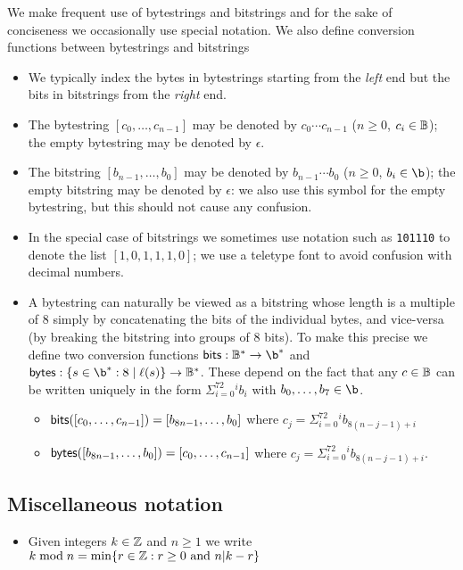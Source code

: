 We make frequent use of bytestrings and bitstrings and for the sake of
conciseness we occasionally use special notation.  We also define conversion
functions between bytestrings and bitstrings

\begin{itemize}
\item We typically index the bytes in bytestrings starting from the
  \textit{left} end but the bits in bitstrings from the \textit{right} end.

\item The bytestring $[c_0, \ldots, c_{n-1}]$ may be denoted by
  $c_0{\cdots}c_{n-1}$ ($n \geq 0$, $c_i \in \mathbb{B}$); the empty bytestring may be
  denoted by $\epsilon$.

\item The  bitstring $[b_{n-1}, \ldots, b_0]$ may be denoted by
  $b_{n-1}{\cdots}b_0$ ($n \geq 0$, $b_i \in \b$); the empty bitstring may be
  denoted by $\epsilon$: we also use this symbol for the empty bytestring, but
  this should not cause any confusion.

\item In the special case of bitstrings we sometimes use notation such as
  \texttt{101110} to denote the list $[1,0,1,1,1,0]$; we use a teletype font to
  avoid confusion with decimal numbers.

\item A bytestring can naturally be viewed as a bitstring whose length is a
  multiple of 8 simply by concatenating the bits of the individual bytes, and
  vice-versa (by breaking the bitstring into groups of 8 bits).  To make this
  precise we define two conversion functions $\bitsof: \B^* \rightarrow \b^*$
  and $\bytesof: \{s \in \b^* : 8 \mid \length(s)\} \rightarrow \B^*$.  These
  depend on the fact that any $c \in \mathbb{B}$ can be written uniquely in the form
  $\Sigma_{i=0}^72^ib_i$ with $b_0, \ldots, b_7 \in \b$.
  \begin{itemize}
    \item $\mathsf{bits}([c_0, \ldots, c_{n-1}]) = [b_{8n-1}, \ldots, b_0]$ where $c_j=\Sigma_{i=0}^72^ib_{8(n-j-1)+i}$
    \item $\mathsf{bytes}([b_{8n-1}, \ldots, b_0]) = [c_0, \ldots, c_{n-1}]$ where $c_j=\Sigma_{i=0}^72^ib_{8(n-j-1)+i}$.
  \end{itemize}
\end{itemize}

\subsection{Miscellaneous notation}
\begin{itemize}
\item Given integers $k \in \mathbb{Z}$ and $n \geq 1$ we write $k \bmod n = \min\{r \in \mathbb{Z}: r \geq 0 \text{ and } n | k - r \}$
\end{itemize}


